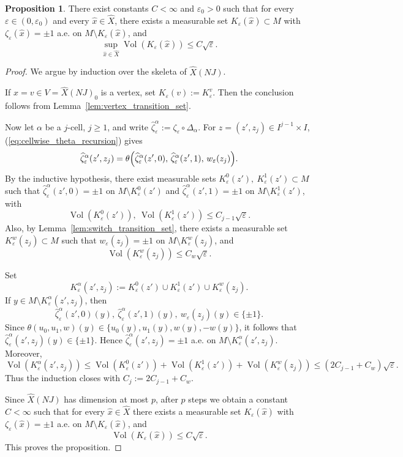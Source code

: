\documentclass[12pt,english]{article}
\theoremstyle{definition}
\newtheorem{proposition}[theorem]{Proposition}
\begin{document}
\begin{proposition}\label{prop:zeta_transition_set}
There exist constants \(C<\infty\) and \(\varepsilon_0>0\) such that for every
\(\varepsilon\in(0,\varepsilon_0)\) and every \(\hat x\in\widehat X\), there exists a measurable set
\(K_\varepsilon(\hat x)\subset M\) with $\zeta_\varepsilon(\hat x)=\pm1$ a.e. on $M\setminus K_\varepsilon(\hat x)$, and
\[
\sup_{\hat x\in\widehat X}\operatorname{Vol}(K_\varepsilon(\hat x))\le C\sqrt\varepsilon.
\]
\end{proposition}

\begin{proof}
We argue by induction over the skeleta of \(\widehat X(NJ)\).

If \(\hat x=v\in V=\widehat X(NJ)_0\) is a vertex, set
$K_\varepsilon(v):=K_\varepsilon^v.$ Then the conclusion follows from Lemma~\ref{lem:vertex_transition_set}.

Now let \(\alpha\) be a \(j\)-cell, \(j\ge1\), and write $ \widehat\zeta^\alpha_\varepsilon:=\zeta_\varepsilon\circ\Delta_\alpha.$ For \(z=(z',z_j)\in I^{j-1}\times I\), (\ref{eq:cellwise_theta_recursion}) gives
\[
\widehat\zeta^\alpha_\varepsilon(z',z_j)
=
\theta\Bigl(
\widehat\zeta^\alpha_\varepsilon(z',0),\,
\widehat\zeta^\alpha_\varepsilon(z',1),\,
w_\varepsilon(z_j)
\Bigr).
\]
By the inductive hypothesis, there exist measurable sets $K_\varepsilon^0(z') ,\ K_\varepsilon^1(z') \subset M$ such that $\widehat\zeta^\alpha_\varepsilon(z',0)=\pm1$ on $M\setminus K_\varepsilon^0(z')$ and $\widehat\zeta^\alpha_\varepsilon(z',1)=\pm1$ on $M\setminus K_\varepsilon^1(z')$, with
\[
\operatorname{Vol}(K_\varepsilon^0(z')),\ \operatorname{Vol}(K_\varepsilon^1(z'))\le C_{j-1}\sqrt\varepsilon.
\]
Also, by Lemma~\ref{lem:switch_transition_set}, there exists a measurable set $K_\varepsilon^w(z_j)\subset M$
such that $w_\varepsilon(z_j)=\pm1$ on $M\setminus K_\varepsilon^w(z_j)$, and
\[
\operatorname{Vol}(K_\varepsilon^w(z_j))\le C_w\sqrt\varepsilon.
\]

Set
\[
K_\varepsilon^\alpha(z',z_j)
:=
K_\varepsilon^0(z')\cup K_\varepsilon^1(z')\cup K_\varepsilon^w(z_j).
\]
If \(y\in M\setminus K_\varepsilon^\alpha(z',z_j)\), then
\[
\widehat\zeta^\alpha_\varepsilon(z',0)(y),\
\widehat\zeta^\alpha_\varepsilon(z',1)(y),\
w_\varepsilon(z_j)(y)\in\{\pm1\}.
\]
Since \(\theta(u_0,u_1,w)(y)\in\{u_0(y),u_1(y),w(y),-w(y)\}\), it follows that $\widehat\zeta^\alpha_\varepsilon(z',z_j)(y)\in\{\pm1\}.$
Hence $\widehat\zeta^\alpha_\varepsilon(z',z_j)=\pm1$
a.e. on $M\setminus K_\varepsilon^\alpha(z',z_j)$. Moreover,
\[
\operatorname{Vol}(K_\varepsilon^\alpha(z',z_j))
\le
\operatorname{Vol}(K_\varepsilon^0(z'))+\operatorname{Vol}(K_\varepsilon^1(z'))+\operatorname{Vol}(K_\varepsilon^w(z_j))
\le
(2C_{j-1}+C_w)\sqrt\varepsilon.
\]
Thus the induction closes with $C_j:=2C_{j-1}+C_w$.

Since \(\widehat X(NJ)\) has dimension at most \(p\), after \(p\) steps we obtain a constant
\(C<\infty\) such that for every \(\hat x\in\widehat X\) there exists a measurable set
\(K_\varepsilon(\hat x)\) with $\zeta_\varepsilon(\hat x)=\pm1$
a.e. on $M\setminus K_\varepsilon(\hat x)$, and
\[
\operatorname{Vol}(K_\varepsilon(\hat x))\le C\sqrt\varepsilon.
\]
This proves the proposition.
\end{proof}
\end{document}

